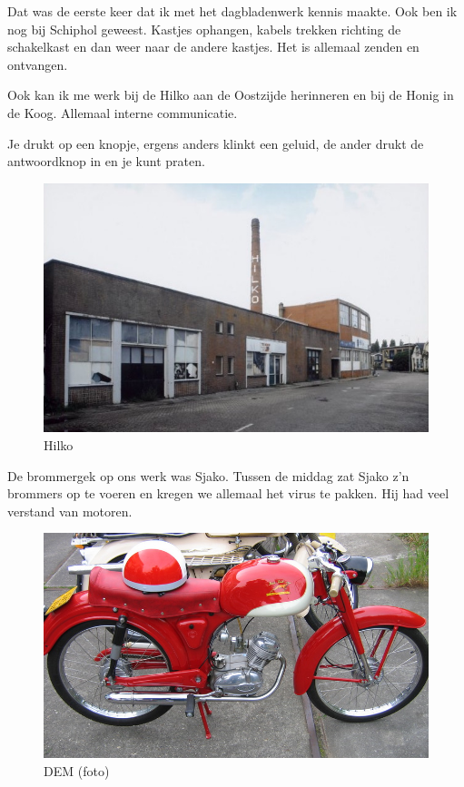 \documentclass[12pt,twoside, openright]{memoir}
\begin{document}
Dat was de eerste keer dat ik met het dagbladenwerk kennis maakte. Ook ben ik nog bij Schiphol geweest. Kastjes ophangen, kabels trekken richting de schakelkast en dan weer naar de andere kastjes. Het is allemaal zenden en ontvangen. 

Ook kan ik me werk bij de Hilko aan de Oostzijde herinneren en bij de Honig in de Koog. Allemaal interne communicatie. 

Je drukt op een knopje, ergens anders klinkt een geluid, de ander drukt de antwoordknop in en je kunt praten.	

\begin{figure}
\includegraphics[width=\textwidth]{img/ch32/Hilko2}
\caption*{\footnotesize Hilko}
\end{figure}

De brommergek op ons werk was Sjako. Tussen de middag zat Sjako z'n brommers op te voeren en kregen we allemaal het virus te pakken. Hij had veel verstand van motoren. 

\begin{figure}
\includegraphics[width=\textwidth]{img/ch32/image-5}
\caption*{\footnotesize DEM (foto)}
\end{figure}
\end{document}
